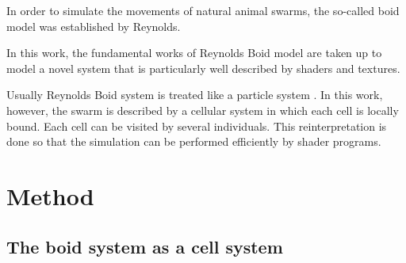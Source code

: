 \documentclass[a4paper, 10pt, journal]{wissarbIEEE}      %
\begin{document}
%
%

In order to simulate the movements of natural animal swarms, the so-called boid model was established by Reynolds. 

In this work, the fundamental works of Reynolds Boid model \cite{Reynolds87flocks} \cite{Reynolds99steeringbehaviors} are taken up to model a novel system that is particularly well described by shaders and textures. 

Usually Reynolds Boid system is treated like a particle system \cite{Reynolds87flocks} \cite{Oliver14Tschesche}. In this work, however, the swarm is described by a cellular system in which each cell is locally bound. Each cell can be visited by several individuals. This reinterpretation is done so that the simulation can be performed efficiently by shader programs.



\section{Method}
\subsection{The boid system as a cell system}
\label{sec_noParticelCells}

\end{document}
